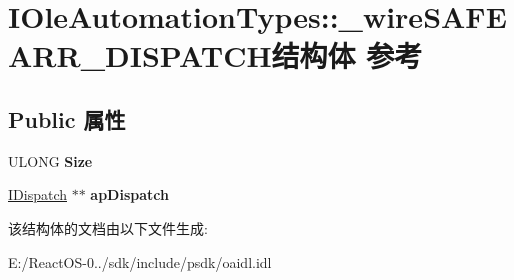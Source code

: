 \hypertarget{struct_i_ole_automation_types_1_1__wire_s_a_f_e_a_r_r___d_i_s_p_a_t_c_h}{}\section{I\+Ole\+Automation\+Types\+:\+:\+\_\+wire\+S\+A\+F\+E\+A\+R\+R\+\_\+\+D\+I\+S\+P\+A\+T\+C\+H结构体 参考}
\label{struct_i_ole_automation_types_1_1__wire_s_a_f_e_a_r_r___d_i_s_p_a_t_c_h}
\subsection*{Public 属性}
\begin{DoxyCompactItemize}
\item 
\mbox{\label{struct_i_ole_automation_types_1_1__wire_s_a_f_e_a_r_r___d_i_s_p_a_t_c_h_ab145896efe646dc24e7902bd389d71b2}} 
U\+L\+O\+NG {\bfseries Size}
\item 
\mbox{\label{struct_i_ole_automation_types_1_1__wire_s_a_f_e_a_r_r___d_i_s_p_a_t_c_h_a578e41b4591782db8ed63e5434103e82}} 
\hyperlink{interface_i_dispatch}{I\+Dispatch} $\ast$$\ast$ {\bfseries ap\+Dispatch}
\end{DoxyCompactItemize}


该结构体的文档由以下文件生成\+:\begin{DoxyCompactItemize}
\item 
E\+:/\+React\+O\+S-\/0../sdk/include/psdk/oaidl.\+idl\end{DoxyCompactItemize}
